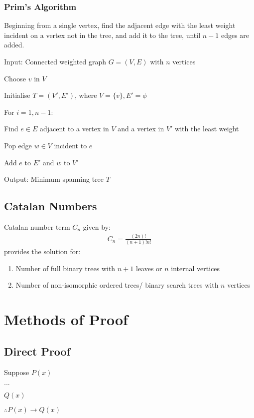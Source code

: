 \documentclass[12pt, a4paper]{article}
\begin{document}
\begin{multicols*}{3}
\subsubsection{Prim's Algorithm}
Beginning from a single vertex, find the adjacent edge with the least weight incident on a vertex not in the tree, and add it to the tree, until $n-1$ edges are added.
\begin{enumproof}[parsep=0em]
  \item Input: Connected weighted graph $G = (V, E)$ with $n$ vertices
  \item Choose $v$ in $V$
  \item Initialise $T = (V', E')$, where $V = \{v\}, E' = \phi$
  \item For $i =1,n-1$:
    \begin{enumproof}[parsep=0em]
    \item Find $e \in E$ adjacent to a vertex in $V$ and a vertex in $V'$ with the least weight
    \item Pop edge $w \in V$ incident to $e$
    \item Add $e$ to $E'$ and $w$ to $V'$
    \end{enumproof}
  \item Output: Minimum spanning tree $T$
\end{enumproof}

\subsection{Catalan Numbers}

Catalan number term $C_n$ given by:
\begin{align*}
  C_n = \frac{(2n)!}{(n+1)!n!}
\end{align*}
provides the solution for:
\begin{enumerate}[\roman*.]
  \item Number of full binary trees with $n+1$ leaves or $n$ internal vertices
  \item Number of non-isomorphic ordered trees/ binary search trees with $n$ vertices
\end{enumerate}

\colbreak
\section*{Methods of Proof}
\subsection{Direct Proof}
\begin{enumproof}[parsep=0em]
  \item Suppose $P(x)$
    \begin{enumproof}[parsep=0em]
  \item $...$
  \item $Q(x)$
  \end{enumproof}
  \item $\therefore P(x) \rightarrow Q(x)$
\end{enumproof}


\end{multicols*}
\end{document}
